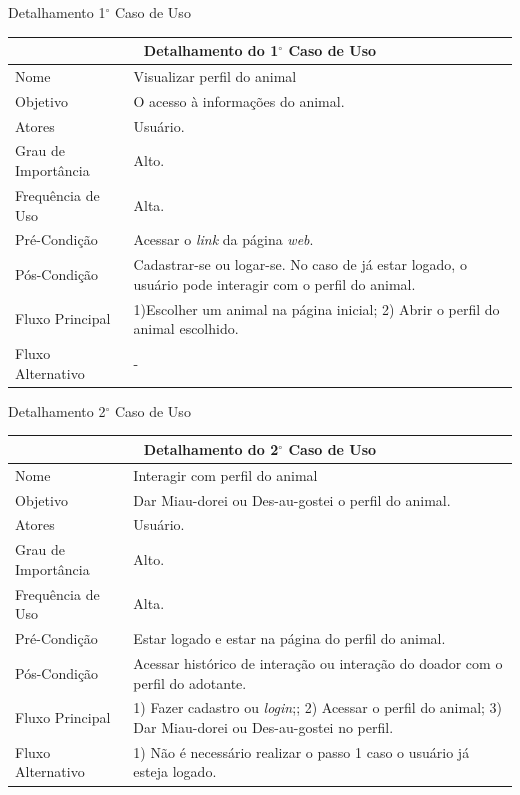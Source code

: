 \begin{apendicesenv}
\begin{quadro}[!htbp]
\caption[Detalhamento 1$^\circ$ Caso de Uso]{Detalhamento 1$^\circ$ Caso de Uso}
\begin{tabular}{|p{4cm}|p{9.95cm}|}
\hline
\multicolumn{2}{|c|}{Detalhamento do 1$^\circ$ Caso de Uso}\\ 
\hline
Nome & Visualizar perfil do animal \\
\hline
Objetivo & O acesso à informações do animal.  \\
\hline
Atores & Usuário. \\
\hline
Grau de Importância & Alto. \\
\hline
Frequência de Uso & Alta. \\
\hline
Pré-Condição & Acessar o \textit{link} da página \textit{web}. \\
\hline
Pós-Condição & Cadastrar-se ou logar-se. No caso de já estar logado, o usuário pode interagir com o perfil do animal. \\
\hline
Fluxo Principal & 1)Escolher um animal na página inicial; 2) Abrir o perfil do animal escolhido.\\
\hline
Fluxo Alternativo & -\\
\hline
\end{tabular}
\end{quadro}

\begin{quadro}[!htbp]
\caption[Detalhamento 2$^\circ$ Caso de Uso]{Detalhamento 2$^\circ$ Caso de Uso}
\begin{tabular}{|p{4cm}|p{9.95cm}|}
\hline
\multicolumn{2}{|c|}{Detalhamento do 2$^\circ$ Caso de Uso}\\ 
\hline
Nome & Interagir com perfil do animal  \\
\hline
Objetivo & Dar \gls{Miau-dorei} ou \gls{Des-au-gostei} o perfil do animal. \\
\hline
Atores & Usuário. \\
\hline
Grau de Importância & Alto. \\
\hline
Frequência de Uso & Alta. \\
\hline
Pré-Condição & Estar logado e estar na página do perfil do animal. \\
\hline
Pós-Condição & Acessar histórico de interação ou interação do doador com o perfil do adotante. \\
\hline
Fluxo Principal & 1) Fazer cadastro ou \textit{login};; 2) Acessar o perfil do animal; 3) Dar \gls{Miau-dorei} ou \gls{Des-au-gostei} no perfil. \\
\hline
Fluxo Alternativo & 1) Não é necessário realizar o passo 1 caso o usuário já esteja logado.\\
\hline
\end{tabular}
\end{quadro}


\end{apendicesenv}
